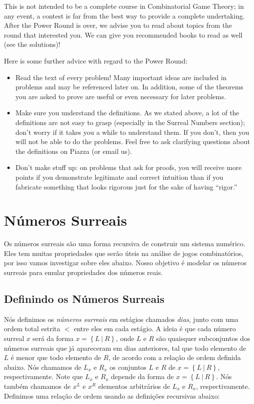 \documentclass[10pt, a4paper]{article}
\newcommand\s[2]{\left\{#1\ |\ #2\right\}}
\begin{document}
	This is not intended to be a complete course in Combinatorial Game Theory; in any event, a contest is far from the best way to provide a complete undertaking. After the Power Round is over, we advise you to read about topics from the round that interested you. We can give you recommended books to read as well (see the solutions)!
	
	Here is some further advice with regard to the Power Round:

	\begin{itemize}
		\item Read the text of every problem! Many important ideas are included in problems and may be referenced later on. In addition, some of the theorems you are asked to prove are useful or even necessary for later problems.
		
		\item Make sure you understand the definitions. As we stated above, a lot of the definitions are not easy to grasp (especially in the Surreal Numbers section); don’t worry if it takes you a while to understand them. If you don’t, then you will not be able to do the problems. Feel free to ask clarifying questions about the definitions on Piazza (or email us).

		\item Don’t make stuff up: on problems that ask for proofs, you will receive more points if you demonstrate legitimate and correct intuition than if you fabricate something that looks rigorous just for the sake of having “rigor.”
	\end{itemize}

	\newpage
	\tableofcontents

	\newpage
	\section{Números Surreais}

	Os números surreais são uma forma recursiva de construir um sistema numérico.
	Eles tem muitas propriedades que serão úteis na análise de jogos combinatórios, por isso vamos investigar sobre eles abaixo.
	Nosso objetivo é modelar os números surreais para emular propriedades dos números reais.

	\subsection{Definindo os Números Surreais}

	Nós definimos os \emph{números surreais} em estágios chamados \emph{dias}, junto com uma ordem total estrita $<$ entre eles em cada estágio.
	A ideia é que cada número surreal $x$ será da forma $x = \s{L}{R}$, onde $L$ e $R$ são quaisquer subconjuntos dos números surreais que já apareceram em dias anteriores, tal que todo elemento de $L$ é menor que todo elemento de $R$, de acordo com a relação de ordem definida abaixo.
	Nós chamamos de $L_x$ e $R_x$ os conjuntos $L$ e $R$ de $x = \s{L}{R}$, respectivamente.
	Note que $L_x$ e $R_x$ depende da forma de $x = \s{L}{R}$.
	Nós também chamamos de $x^L$ e $x^R$ elementos arbitrários de $L_x$ e $R_x$, respectivamente.
	Definimos uma relação de ordem usando as definições recursivas abaixo:
\end{document}
